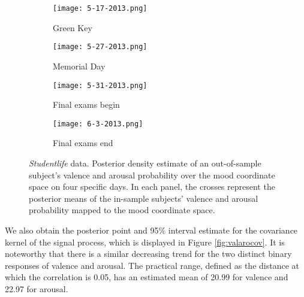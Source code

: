 \begin{figure}[t!]
    \centering
    \begin{subfigure}[b]{0.24\textwidth}
            \texttt{[image: 5-17-2013.png]}
            \caption{{\footnotesize Green Key}}
    \end{subfigure}
    \begin{subfigure}[b]{0.24\textwidth}
            \texttt{[image: 5-27-2013.png]}
            \caption{{\footnotesize Memorial Day}}
    \end{subfigure}
    \begin{subfigure}[b]{0.24\textwidth}
            \texttt{[image: 5-31-2013.png]}
            \caption{{\footnotesize Final exams begin}}
    \end{subfigure}
    \begin{subfigure}[b]{0.24\textwidth}
            \texttt{[image: 6-3-2013.png]}
            \caption{{\footnotesize Final exams end}}
    \end{subfigure}
\caption{\textit{Studentlife} data. Posterior density estimate of an out-of-sample 
subject's valence and arousal probability over the mood coordinate space on four 
specific days. In each panel, the crosses represent the posterior means of the 
in-sample subjects' valence and arousal probability mapped to the mood coordinate space.}
    \label{fig:densityday}
\end{figure}



We also obtain the posterior point and 95\% interval estimate for the covariance kernel 
of the signal process, which is displayed in Figure \ref{fig:valarocov}. 
It is noteworthy that there is a similar decreasing trend for the two distinct 
binary responses of valence and arousal. The practical range, defined as the distance 
at which the correlation is 0.05, has an estimated mean of 20.99 for valence 
and 22.97 for arousal. 

